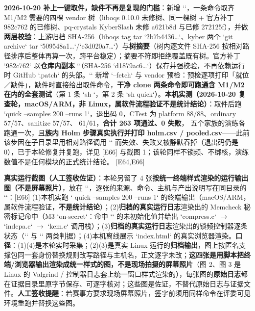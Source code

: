 \documentclass[UTF8,fontset=fandol,11pt,a4paper]{ctexart}
\begin{document}
\textbf{2026-10-20 补上一键取件，缺件不再是复现的门槛}：新增 `\texttt{}`，一条命令取齐 M1/M2 需要的四棵 vendor 树（liboqs 0.10.0 未修树、同一棵树 + 官方补丁 982c762 的已修树、pq-crystals KyberSlash 未修 a621b8d 与已修 272125f），并做\textbf{两层校验}：上游归档 SHA-256（liboqs tag tar `2b7b4436…`、kyber 两个 `git archive` tar `509548a1…`/`e3d020a7…`）与\textbf{树摘要}（树内逐文件 SHA-256 按相对路径排序后整体再算一次，跨平台稳定）；摘要不符即拒绝覆盖既有树。官方补丁 `982c762` 以\textbf{仓库内副本} `\texttt{}`（SHA-256 `d1879ac6…`）保存并强校验，不再依赖运行时 GitHub `.patch` 的头部。`\texttt{}` 新增 `--fetch` 与 vendor 预检：预检逐项打印「就位／缺件」，缺件时直接给出取件命令，\textbf{干净 clone 两条命令即可跑通含 M1/M2 在内的全套测试}（第 1 条 `sh \texttt{}`，第 2 条 `sh \texttt{} quick`）。\textbf{本机实测（2026-10-20 复查轮，macOS/ARM，非 \texttt{} Linux，属软件流程验证不是统计结论）}：取件后跑 `quick --samples 200 --runs 1`，退出码 0，CTest 为 platform 88/88、ordinary 57/57、sanitize 57/57、\texttt{} 61/61，\textbf{合计 263 项通过、0 失败}，\texttt{} 五个家族的演练各跑通一次，且\textbf{族内 Holm 步骤真实执行并打印 holm.csv / pooled.csv}——此前该步因在子目录里用相对路径调用 `\texttt{}` 而失效、失败又被静默吞掉（退出码仍是 0），已于本轮修复并复跑，详见 [E66] 与截图 1；该轮同样不锁频、不绑核，演练数值不是任何模块的正式统计结论。 [E64,E66]


\textbf{真实运行截图（人工签收佐证）}：本轮另留了 4 张\textbf{按统一终端样式渲染的运行输出图（不是屏幕照片）}，放在 `\texttt{}`，逐张的来源、命令、主机与产出说明写在同目录的 `\texttt{}`：[E66] (1)本机实跑 `\texttt{} quick --samples 200 --runs 1` 的终端输出（macOS/ARM，属软件流程验证，\textbf{不是统计结论}）；(2)\textbf{归档的真实运行日志}渲染出的 Memcheck 秘密标记命中（M3 `on-secret`：命中 `\texttt{}` 的未初始化值并给出 `compress.c` \texorpdfstring{$\rightarrow$}{->} `indcpa.c` \texorpdfstring{$\rightarrow$}{->} `kem.c` 调用栈）；(3)\textbf{归档的真实运行日志}渲染出的锁频控制器逐条状态（`\texttt{}` 与 `\texttt{}` 两类判据）；(4)本机离线展示 `index.html` 的真实浏览器渲染。\textbf{口径}：(1)(4)是本轮实时采集；(2)(3)是真实 Linux 运行的\textbf{归档输出}，图上按匿名支撑包同一套身份替换规则改写路径与主机名，正文逐字未改；\textbf{这四张是用脚本把终端/浏览器输出渲染成统一样式的图，不是现场拍摄的屏幕照片}（图 2、图 3 是 Linux 的 Valgrind / 控制器日志套上统一窗口样式渲染的），每张图的\textbf{原始日志}都在证据目录里原字节保存、可逐字核对；这些图是佐证，不替代原始日志与证据文件。\textbf{人工签收提醒}：若赛事方要求现场屏幕照片，签字前须用同样命令在评委可见环境重跑并替换这些图。
\end{document}
